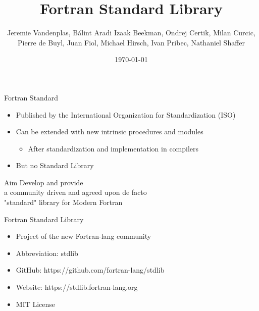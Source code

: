 \documentclass{beamer}
\title{Fortran Standard Library}
\author{Jeremie Vandenplas,
Bálint Aradi
Izaak Beekman,
Ondrej Certik,
Milan Curcic,
Pierre de Buyl,
Juan Fiol,
Michael Hirsch,
Ivan Pribec,
Nathaniel Shaffer}
\date{\today}
\begin{document}
\begin{frame}[t]
	\titlepage
\end{frame}	

\begin{frame}[c]{Fortran Standard}
	\begin{itemize}
		\item Published by the International Organization for Standardization (ISO)
		\item Can be extended with new intrinsic procedures and modules
		\begin{itemize}
			\item After standardization and implementation in compilers
		\end{itemize}
		\item But no Standard Library
	\end{itemize}
\end{frame}

\begin{frame}[c]{Aim}
	\center
	Develop and provide\\
	a community driven and agreed upon de facto\\
	"standard" library for Modern Fortran
\end{frame}

\begin{frame}[c]{Fortran Standard Library}
	\begin{itemize}
		\item Project of the new Fortran-lang community
		\item Abbreviation: stdlib
		\item GitHub: https://github.com/fortran-lang/stdlib
		\item Website: https://stdlib.fortran-lang.org
		\item MIT License
	\end{itemize}
\end{frame}
\end{document}
